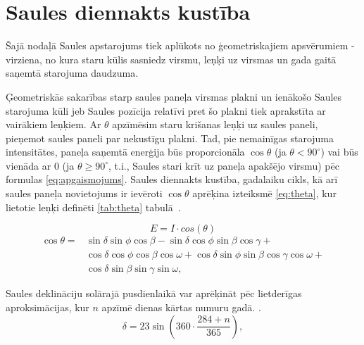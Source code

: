 
\section{Saules diennakts kustība}\label{section:kustiba}

Šajā nodaļā Saules apstarojums tiek aplūkots no ģeometriskajiem apsvērumiem - virziena, no kura staru kūlis sasniedz virsmu, leņķi uz virsmas un gada gaitā saņemtā starojuma daudzuma.

Ģeometriskās sakarības starp saules paneļa virsmas plakni un ienākošo Saules starojuma kūli jeb Saules pozīcija relatīvi pret šo plakni tiek aprakstīta ar vairākiem leņķiem. Ar $\theta$ apzīmēsim staru krišanas leņķi uz saules paneli, pieņemot saules paneli par nekustīgu plakni. Tad, pie nemainīgas starojuma intensitātes, paneļa saņemtā enerģija būs proporcionāla $\cos{\theta}$ (ja $\theta<90^\circ$) vai būs vienāda ar 0 (ja $\theta \geq 90^\circ$, t.i., Saules stari krīt uz paneļa apakšējo virsmu) pēc formulas \ref{eq:apgaismojums}. Saules diennakts kustība, gadalaiku cikls, kā arī saules paneļa novietojums ir ievēroti $\cos{\theta}$ aprēķina izteiksmē \ref{eq:theta}, kur lietotie leņķi definēti \ref{tab:theta} tabulā~\cite{ThermalProcesses}.

\begin{equation}
\label{eq:apgaismojums}
E = I \cdot cos(\theta)
\end{equation}
\begin{equation}
\label{eq:theta}
\begin{aligned}
\cos{\theta} = {} & \sin{\delta} \sin{\phi} \cos{\beta} - \sin{\delta} \cos{\phi} \sin{\beta} \cos{\gamma} +                           \\
	& \cos{\delta} \cos{\phi} \cos{\beta} \cos{\omega} + \cos{\delta} \sin{\phi} \sin{\beta} \cos{\gamma} \cos{\omega} + \\
	& \cos{\delta} \sin{\beta} \sin{\gamma} \sin{\omega},
\end{aligned}
\end{equation}

Saules deklināciju solārajā pusdienlaikā var aprēķināt pēc lietderīgas aproksimācijas, kur $n$ apzīmē dienas kārtas numuru gadā. \cite{cooper1969}.
\begin{equation}
\label{eq:delta}
    \delta = 23 \sin \left( 360 \cdot \frac{284+n}{365} \right),
\end{equation}

